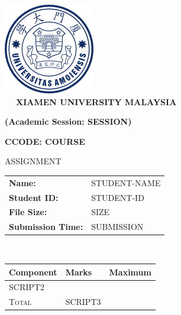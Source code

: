 \documentclass[12pt]{article}
\begin{document}
\begin{center}
	 \includegraphics[scale=3]{fig_logo.png} \\
	 \verb|  |
	 \centering
	 {\large \textbf{\textsf{XIAMEN UNIVERSITY MALAYSIA}}}

	 \textbf{\textsf{(Academic Session: SESSION)}}
	 
	 \vspace{20pt}
	 {\Large {\textbf{CCODE: COURSE
	 }}}
	 
	 
	 \vspace{5pt}
	 {\LARGE \textsc{ASSIGNMENT}}
	
	\vspace{15pt}
	
	\begin{tabularx}{1\textwidth} { 
		   >{\raggedleft\arraybackslash\hsize=0.5\hsize}X 
		   >{\raggedright\arraybackslash\hsize=0.5\hsize}X }
		\textbf{Name:} & STUDENT-NAME \\ 
		
		\textbf{Student ID:} & STUDENT-ID \\   
		
		\textbf{File Size:} & SIZE \\  
		
		\textbf{Submission Time:} & SUBMISSION \\
	\end{tabularx}
	\\
	\vspace{30pt}
	\setlength\arrayrulewidth{1pt}
	\def\arraystretch{1.75}
	\begin{tabularx}{0.8\textwidth}{
			|>{\centering\arraybackslash\hsize=0.5\hsize}X|
			>{\centering\arraybackslash\hsize=0.25\hsize}X|
			>{\centering\arraybackslash\hsize=0.25\hsize}X|
		}	
		\hline
		\rowcolor{LightOrange}
		\textbf{Component}& \textbf{Marks} & \textbf{Maximum} \\  \hline
		SCRIPT2 \\ \hline
		\rowcolor{LightBlue}
		\textsc{Total} &  SCRIPT3  \\ \hline
	\end{tabularx}
\end{center}
\end{document}
